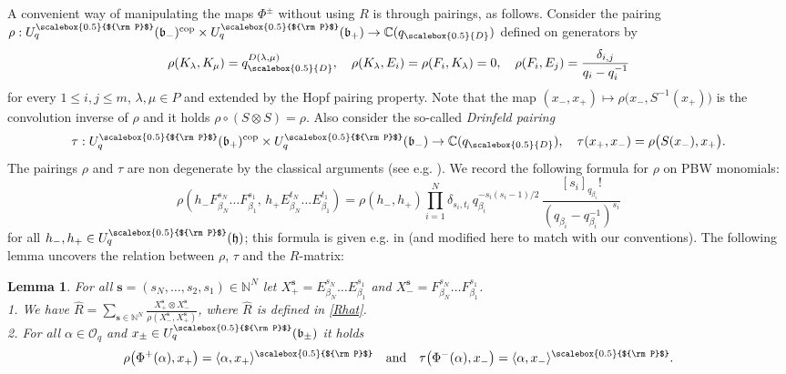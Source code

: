 \documentclass[11pt]{amsart}
\newtheorem{lem}[teo]{Lemma}
\newcommand{\mc}{\mathbb{C}}
\newcommand{\Oo}{\mathcal{O}}
\newcommand{\qD}{q_{\scalebox{0.5}{D}}}
\newcommand{\Pup}{{\scalebox{0.5}{${\rm P}$}}}
\begin{document}
\indent A convenient way of manipulating the maps $\Phi^{\pm}$ without using $R$ is through pairings, as follows. Consider the pairing $\rho : U_q^\Pup(\mathfrak{b}_-)^{\rm cop}\times U_q^\Pup(\mathfrak{b}_+) \to \mc(\qD)$ defined on generators by
\begin{equation}\label{defrho}
\rho(K_\lambda, K_\mu) = \qD^{D(\lambda,\mu)}, \quad \rho(K_\lambda,E_i) = \rho(F_i, K_\lambda) = 0, \quad \rho(F_i,E_j) = \frac{\delta_{i,j}}{q_i - q_i^{-1}}
\end{equation}
for every $1 \leq i,j\leq m$, $\lambda,\mu\in P$ and extended by the Hopf pairing property. Note that the map $(x_-,x_+)\mapsto \rho\bigl(x_-,S^{-1}(x_+)\bigr)$ is the convolution inverse of $\rho$ and it holds $\rho \circ (S \otimes S) = \rho$. Also consider the so-called {\em Drinfeld pairing}
\begin{equation}\label{deftau}
\tau:U_q^\Pup(\mathfrak b_+)^{\rm cop} \times  U_q^\Pup(\mathfrak b_-) \to \mc(\qD), \quad \tau(x_+,x_-) = \rho\bigl( S(x_-), x_+ \bigr).
\end{equation}
The pairings $\rho$ and $\tau$ are non degenerate by the classical arguments (see e.g. \cite[Th.\,3.92]{VY}). We record the following formula for $\rho$ on PBW monomials:
\begin{equation}\label{expressionRho}
\rho\left( h_- F_{\beta_N}^{s_N} \ldots F_{\beta_1}^{s_1}, \,h_+ E_{\beta_N}^{t_N} \ldots E_{\beta_1}^{t_1} \right) = \rho(h_-,h_+)\prod_{i=1}^N \delta_{s_i,t_i} \, q_{\beta_i}^{-s_i(s_i - 1)/2}\,\frac{[s_i]_{q_{\beta_i}}!}{(q_{\beta_i} - q_{\beta_i}^{-1})^{s_i}}
\end{equation}
for all $h_-,h_+ \in U_q^\Pup(\mathfrak{h})$; this formula  is given e.g. in \cite[Th.\,2.4]{DC-L} (and modified here to match with our conventions). The following lemma uncovers the relation between $\rho$, $\tau$ and the $R$-matrix:
\begin{lem}\label{lemRhoVsRMat}
For all $\boldsymbol{s} = (s_N,\ldots,s_2,s_1) \in \mathbb{N}^N$ let $X_+^{\boldsymbol{s}} = E_{\beta_N}^{s_N} \ldots E_{\beta_1}^{s_1}$ and $X_-^{\boldsymbol{s}} = F_{\beta_N}^{s_N} \ldots F_{\beta_1}^{s_1}$.
\\1. We have $\widehat{R} = \sum_{\boldsymbol{s}\in \mathbb{N}^N} \frac{X_+^{\boldsymbol{s}} \otimes X_-^{\boldsymbol{s}}}{\rho(X_-^{\boldsymbol{s}}, X_+^{\boldsymbol{s}})}$, where $\widehat{R}$ is defined in \eqref{Rhat}.
\\2. For all $\alpha\in \Oo_q$ and  $x_\pm \in U_q^\Pup(\mathfrak{b}_\pm)$ it holds
\begin{equation}\label{RhoTauQgen}
\rho\bigl( \Phi^+(\alpha),x_+ \bigr) = \langle \alpha,x_+\rangle^\Pup \quad \text{and} \quad \tau\bigl( \Phi^-(\alpha),x_- \bigr) = \langle \alpha,x_-\rangle^\Pup.
\end{equation}
\end{lem}
\end{document}
